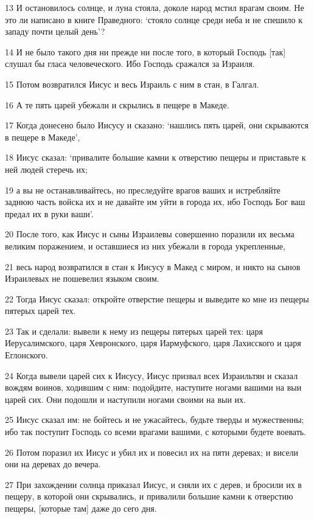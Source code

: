 \par 13 И остановилось солнце, и луна стояла, доколе народ мстил врагам своим. Не это ли написано в книге Праведного: `стояло солнце среди неба и не спешило к западу почти целый день'?
\par 14 И не было такого дня ни прежде ни после того, в который Господь [так] слушал бы гласа человеческого. Ибо Господь сражался за Израиля.
\par 15 Потом возвратился Иисус и весь Израиль с ним в стан, в Галгал.
\par 16 А те пять царей убежали и скрылись в пещере в Македе.
\par 17 Когда донесено было Иисусу и сказано: `нашлись пять царей, они скрываются в пещере в Македе',
\par 18 Иисус сказал: `привалите большие камни к отверстию пещеры и приставьте к ней людей стеречь их;
\par 19 а вы не останавливайтесь, но преследуйте врагов ваших и истребляйте заднюю часть войска их и не давайте им уйти в города их, ибо Господь Бог ваш предал их в руки ваши'.
\par 20 После того, как Иисус и сыны Израилевы совершенно поразили их весьма великим поражением, и оставшиеся из них убежали в города укрепленные,
\par 21 весь народ возвратился в стан к Иисусу в Макед с миром, и никто на сынов Израилевых не пошевелил языком своим.
\par 22 Тогда Иисус сказал: откройте отверстие пещеры и выведите ко мне из пещеры пятерых царей тех.
\par 23 Так и сделали: вывели к нему из пещеры пятерых царей тех: царя Иерусалимского, царя Хевронского, царя Иармуфского, царя Лахисского и царя Еглонского.
\par 24 Когда вывели царей сих к Иисусу, Иисус призвал всех Израильтян и сказал вождям воинов, ходившим с ним: подойдите, наступите ногами вашими на выи царей сих. Они подошли и наступили ногами своими на выи их.
\par 25 Иисус сказал им: не бойтесь и не ужасайтесь, будьте тверды и мужественны; ибо так поступит Господь со всеми врагами вашими, с которыми будете воевать.
\par 26 Потом поразил их Иисус и убил их и повесил их на пяти деревах; и висели они на деревах до вечера.
\par 27 При захождении солнца приказал Иисус, и сняли их с дерев, и бросили их в пещеру, в которой они скрывались, и привалили большие камни к отверстию пещеры, [которые там] даже до сего дня.
